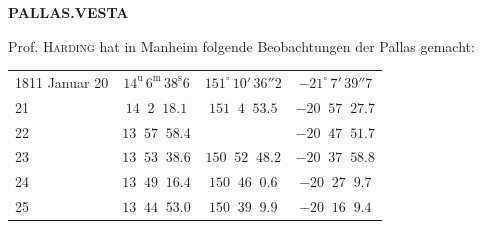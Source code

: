 \clearpage
\thispagestyle{empty}
\noindent{}%
%
\parbox[t]{\dimexpr\linewidth-24mm\relax}{\centering\footnotesize\bfseries PALLAS.\quad VESTA\par}%
\makebox[12mm][r]{}\par\nobreak\medskip
\par\indent Prof. \textsc{Harding} hat in Manheim folgende Beobachtungen der Pallas gemacht:
\begin{center}\fontsize{10}{12}\selectfont\setlength{\tabcolsep}{4pt}\renewcommand{\arraystretch}{1.15}
\begin{tabular}{l|c|c|c}
1811 Januar 20 & $14^{\mathrm u}\,6^{\mathrm m}\,38^{\mathrm s}6$ & $151^\circ\,10'\,36''2$ & $-21^\circ\,7'\,39''7$ \\
\phantom{1811 Januar }21 & $14\;\;2\;\;18.1$ & $151\;\;4\;\;53.5$ & $-20\;\;57\;\;27.7$ \\
\phantom{1811 Januar }22 & $13\;\;57\;\;58.4$ & & $-20\;\;47\;\;51.7$ \\
\phantom{1811 Januar }23 & $13\;\;53\;\;38.6$ & $150\;\;52\;\;48.2$ & $-20\;\;37\;\;58.8$ \\
\phantom{1811 Januar }24 & $13\;\;49\;\;16.4$ & $150\;\;46\;\;0.6$ & $-20\;\;27\;\;9.7$ \\
\phantom{1811 Januar }25 & $13\;\;44\;\;53.0$ & $150\;\;39\;\;9.9$ & $-20\;\;16\;\;9.4$ \\
\end{tabular}
\end{center}


